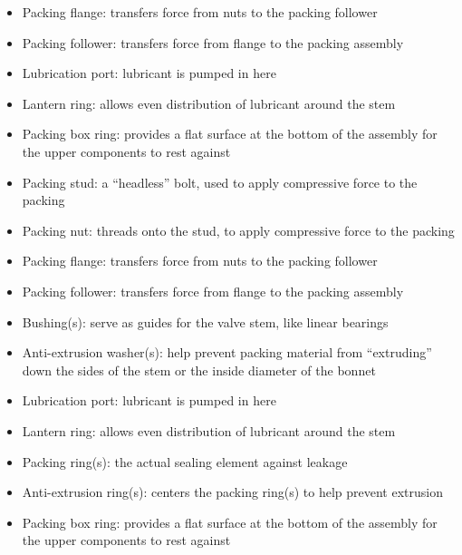 \begin{itemize}
\item{} Packing flange: transfers force from nuts to the packing follower
\item{} Packing follower: transfers force from flange to the packing assembly
\item{} Lubrication port: lubricant is pumped in here
\item{} Lantern ring: allows even distribution of lubricant around the stem
\item{} Packing box ring: provides a flat surface at the bottom of the assembly for the upper components to rest against
\end{itemize}







\begin{itemize}
\item{} Packing stud: a ``headless'' bolt, used to apply compressive force to the packing
\item{} Packing nut: threads onto the stud, to apply compressive force to the packing
\item{} Packing flange: transfers force from nuts to the packing follower
\item{} Packing follower: transfers force from flange to the packing assembly
\item{} Bushing(s): serve as guides for the valve stem, like linear bearings
\item{} Anti-extrusion washer(s): help prevent packing material from ``extruding'' down the sides of the stem or the inside diameter of the bonnet
\item{} Lubrication port: lubricant is pumped in here
\item{} Lantern ring: allows even distribution of lubricant around the stem
\item{} Packing ring(s): the actual sealing element against leakage
\item{} Anti-extrusion ring(s): centers the packing ring(s) to help prevent extrusion
\item{} Packing box ring: provides a flat surface at the bottom of the assembly for the upper components to rest against
\end{itemize}





